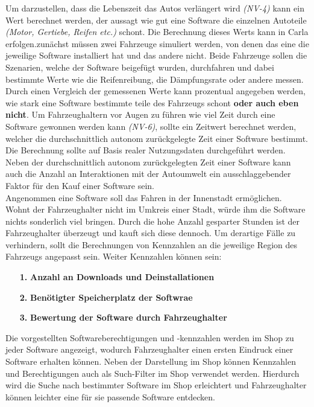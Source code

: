 Um darzustellen, dass die Lebenszeit das Autos verlängert wird \textit{(NV-4)} kann ein Wert berechnet werden, der aussagt wie gut eine Software die einzelnen Autoteile \textit{(Motor, Gertiebe, Reifen etc.)} schont. Die Berechnung dieses Werts kann in Carla erfolgen.zunächst müssen zwei Fahrzeuge simuliert werden, von denen das eine die jeweilige Software installiert hat und das andere nicht. Beide Fahrzeuge sollen die Szenarien, welche der Software beigefügt wurden, durchfahren und dabei bestimmte Werte wie die Reifenreibung, die Dämpfungsrate oder andere messen. Durch einen Vergleich der gemessenen Werte kann prozentual angegeben werden, wie stark eine Software bestimmte teile des Fahrzeugs schont \textbf{oder auch eben nicht}. Um Fahrzeughaltern vor Augen zu führen wie viel Zeit durch eine Software gewonnen werden kann \textit{(NV-6)}, sollte ein Zeitwert berechnet werden, welcher die durchschnittlich autonom zurückgelegte Zeit einer Software bestimmt. Die Berechnung sollte auf Basis realer Nutzungsdaten durchgeführt werden. Neben der durchschnittlich autonom zurückgelegten Zeit einer Software kann auch die Anzahl an Interaktionen mit der Autoumwelt ein ausschlaggebender Faktor für den Kauf einer Software sein. \\
Angenommen eine Software soll das Fahren in der Innenstadt ermöglichen. Wohnt der Fahrzeughalter nicht im Umkreis einer Stadt, würde ihm die Software nichts sonderlich viel bringen. Durch die hohe Anzahl gesparter Stunden ist der Fahrzeughalter überzeugt und kauft sich diese dennoch. Um derartige Fälle zu verhindern, sollt die Berechnungen von Kennzahlen an die jeweilige Region des Fahrzeugs angepasst sein. Weiter Kennzahlen können sein:
\begin{itemize}
	\item[\textbf{1.}]\textbf{Anzahl an Downloads und Deinstallationen}
	\item[\textbf{2.}]\textbf{Benötigter Speicherplatz der Softwrae}
	\item[\textbf{3.}]\textbf{Bewertung der Software durch Fahrzeughalter}
\end{itemize}


Die vorgestellten Softwareberechtigungen und -kennzahlen werden im Shop zu jeder Software angezeigt, wodurch Fahrzeughalter einen ersten Eindruck einer Software erhalten können. Neben der Darstellung im Shop können Kennzahlen und Berechtigungen auch als Such-Filter im Shop verwendet werden. Hierdurch wird die Suche nach bestimmter Software im Shop erleichtert und Fahrzeughalter können leichter eine für sie passende Software entdecken. 

